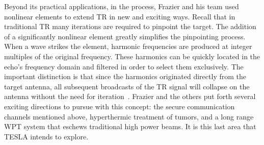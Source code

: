 Beyond its practical applications, in the process, Frazier and his team used nonlinear elements to extend TR in new and exciting ways. Recall that in traditional TR many iterations are required to pinpoint the target. The addition of a significantly nonlinear element greatly simplifies the pinpointing process. When a wave strikes the element, harmonic frequencies are produced at integer multiples of the original frequency. These harmonics can be quickly located in the echo's frequency domain and filtered in order to select them exclusively. The important distinction is that since the harmonics originated directly from the target antenna, all subsequent broadcasts of the TR signal will collapse on the antenna without the need for iteration~\cite{nltr-wave-chaotic}. Frazier and the others put forth several exciting directions to pursue with this concept: the secure communication channels mentioned above, hyperthermic treatment of tumors, and a long range WPT system that eschews traditional high power beams. It is this last area that TESLA intends to explore.
